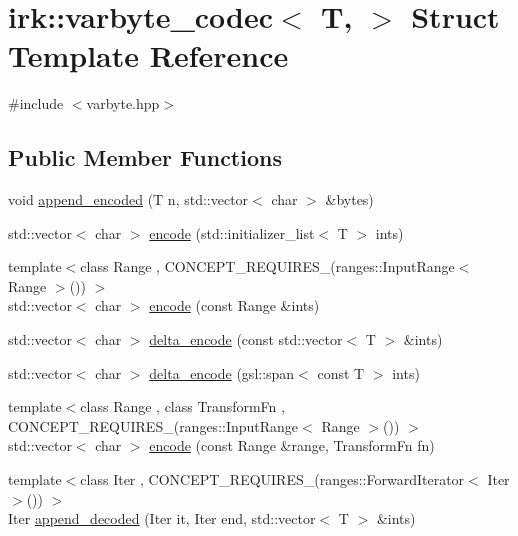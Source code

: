 \hypertarget{structirk_1_1varbyte__codec}{}\section{irk\+:\+:varbyte\+\_\+codec$<$ T, $>$ Struct Template Reference}
\label{structirk_1_1varbyte__codec}


{\ttfamily \#include $<$varbyte.\+hpp$>$}

\subsection*{Public Member Functions}
\begin{DoxyCompactItemize}
\item 
void \mbox{\hyperlink{structirk_1_1varbyte__codec_a040800a5446dcd87f19f8cd77dd132df}{append\+\_\+encoded}} (T n, std\+::vector$<$ char $>$ \&bytes)
\item 
std\+::vector$<$ char $>$ \mbox{\hyperlink{structirk_1_1varbyte__codec_a73f7d831c8114aab1bc8ba1b78cb0bb3}{encode}} (std\+::initializer\+\_\+list$<$ T $>$ ints)
\item 
{\footnotesize template$<$class Range , C\+O\+N\+C\+E\+P\+T\+\_\+\+R\+E\+Q\+U\+I\+R\+E\+S\+\_\+(ranges\+::\+Input\+Range$<$ Range $>$()) $>$ }\\std\+::vector$<$ char $>$ \mbox{\hyperlink{structirk_1_1varbyte__codec_a3e65117c796984e516769d2d28fd73bf}{encode}} (const Range \&ints)
\item 
std\+::vector$<$ char $>$ \mbox{\hyperlink{structirk_1_1varbyte__codec_a5f9bba73adbbd513708a1babc8324239}{delta\+\_\+encode}} (const std\+::vector$<$ T $>$ \&ints)
\item 
std\+::vector$<$ char $>$ \mbox{\hyperlink{structirk_1_1varbyte__codec_a191f382522d0e711ee40fa3ab6101335}{delta\+\_\+encode}} (gsl\+::span$<$ const T $>$ ints)
\item 
{\footnotesize template$<$class Range , class Transform\+Fn , C\+O\+N\+C\+E\+P\+T\+\_\+\+R\+E\+Q\+U\+I\+R\+E\+S\+\_\+(ranges\+::\+Input\+Range$<$ Range $>$()) $>$ }\\std\+::vector$<$ char $>$ \mbox{\hyperlink{structirk_1_1varbyte__codec_abf78b8a557eccd238fd4c3d7f381dd12}{encode}} (const Range \&range, Transform\+Fn fn)
\item 
{\footnotesize template$<$class Iter , C\+O\+N\+C\+E\+P\+T\+\_\+\+R\+E\+Q\+U\+I\+R\+E\+S\+\_\+(ranges\+::\+Forward\+Iterator$<$ Iter $>$()) $>$ }\\Iter \mbox{\hyperlink{structirk_1_1varbyte__codec_ac3f5abee39693d13a69c2aaa24f8095f}{append\+\_\+decoded}} (Iter it, Iter end, std\+::vector$<$ T $>$ \&ints)

\end{DoxyCompactItemize}
